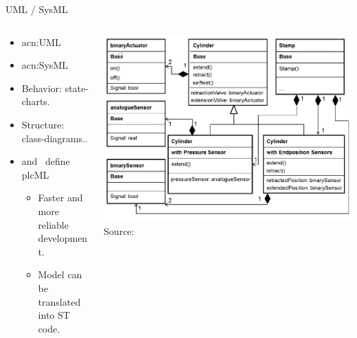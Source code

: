 \documentclass[18pt]{beamer}
\begin{document}
\begin{frame}{UML / SysML}
\begin{columns}
    \begin{column}{0.6\textwidth}
        \begin{itemize}
            \item \acrfull{acn:UML}
            \item  \acrfull{acn:SysML}
            \item Behavior: state-charts.
            \item Structure: class-diagrams..
            \item \cite{WITSCH2015} and~\cite{VH:2014} define plcML
            \begin{itemize}
                \item Faster and more reliable development.
                \item Model can be translated into ST code.
            \end{itemize}
        \end{itemize}
    \end{column}
    \begin{column}{0.4\textwidth}
        \includegraphics[width=\textwidth]{./figures/modAT4rMS_struct.png}
       {\footnotesize  Source:~\cite{VH:2014}}
    \end{column}
\end{columns}

\end{frame}
\end{document}
